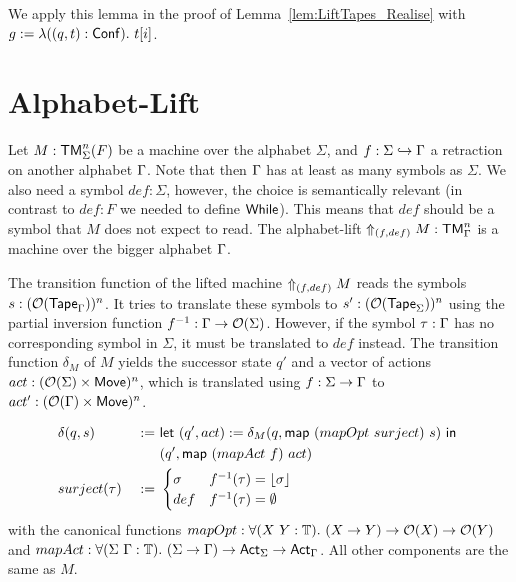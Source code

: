 We apply this lemma in the proof of Lemma~\ref{lem:LiftTapes_Realise} with $g := \lambda ((q,t):\Conf).~t[i]$.



\section{Alphabet-Lift}
\label{sec:sigma-Lift}

Let $M : \TM_\Sigma^n(F)$ be a machine over the alphabet $\Sigma$, and $f : \Sigma \hookrightarrow \Tau$ a retraction on another alphabet $\Tau$.
Note that then $\Tau$ has at least as many symbols as $\Sigma$.  We also need a symbol $def:\Sigma$, however, the choice is semantically relevant (in
contrast to $def:F$ we needed to define $\While$).  This means that $def$ should be a symbol that $M$ does not expect to read.  The alphabet-lift
$\LiftAlphabet{M}{(f,def)} : \TM_\Tau^n$ is a machine over the bigger alphabet $\Tau$.

The transition function of the lifted machine $\LiftAlphabet{M}{(f,def)}$ reads the symbols \\$s :
(\Option(\Tape_\Tau))^n$.  It tries to translate these symbols to $s':(\Option(\Tape_\Sigma))^n$ using the partial inversion function $f^{-1} : \Tau
\to \Option(\Sigma)$.  However, if the symbol $\tau:\Tau$ has no corresponding symbol in $\Sigma$, it must be translated to
$def$ instead.  The transition function $\delta_M$ of $M$ yields the successor state $q'$ and a vector of actions $act: (\Option(\Sigma) \times
\MS{Move})^n$, which is translated using $f:\Sigma\to\Tau$ to $act' : (\Option(\Tau) \times \MS{Move})^n$.

\begin{definition}
  \label{def:LiftAlphabet}
  \begin{alignat*}{2}
    &\delta(q,s)    &~:=~& \Let{(q', act) := \delta_M(q, \map{(mapOpt~surject)}{s})}{\\%
    &               &~  ~& (q', \map{(mapAct~f)}{act})} \\
    & surject(\tau) &~:=~&
    \begin{cases}
      \sigma & f^{-1}(\tau) = \Some{\sigma} \\
      def & f^{-1}(\tau) = \None
    \end{cases}
  \end{alignat*}
  with the canonical functions $mapOpt: \forall (X~Y:\Type).~ (X \to Y) \to \Option(X) \to \Option(Y)$ and
  $mapAct : \forall (\Sigma~\Tau:\Type).~(\Sigma\to\Tau) \to \Act_\Sigma \to \Act_\Tau$.  All other components are the same as $M$.
\end{definition}

